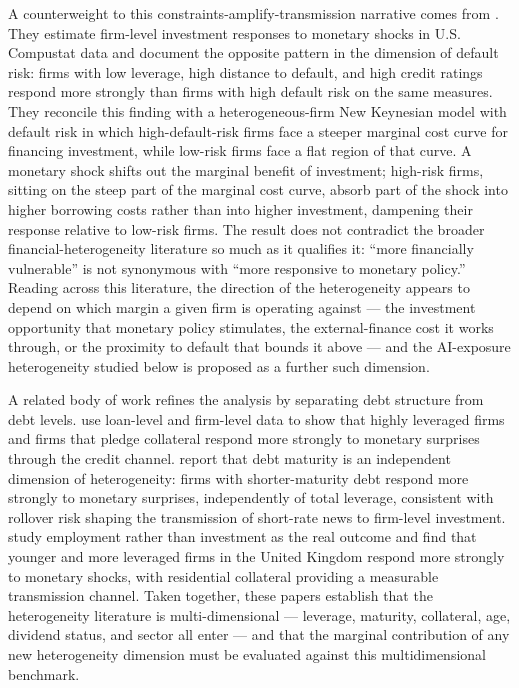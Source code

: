 A counterweight to this constraints-amplify-transmission narrative
comes from \citet{ottonelloWinberry2020}. They estimate firm-level
investment responses to monetary shocks in U.S. Compustat data and
document the opposite pattern in the dimension of default risk:
firms with low leverage, high distance to default, and high credit
ratings respond more strongly than firms with high default risk on
the same measures. They reconcile this finding with a
heterogeneous-firm New Keynesian model with default risk in which
high-default-risk firms face a steeper marginal cost curve for
financing investment, while low-risk firms face a flat region of
that curve. A monetary shock shifts out the marginal benefit of
investment; high-risk firms, sitting on the steep part of the
marginal cost curve, absorb part of the shock into higher
borrowing costs rather than into higher investment, dampening their
response relative to low-risk firms. The \citet{ottonelloWinberry2020}
result does not contradict the broader financial-heterogeneity
literature so much as it qualifies it: ``more financially
vulnerable'' is not synonymous with ``more responsive to monetary
policy.'' Reading across this literature, the direction of the
heterogeneity appears to depend on which margin a given firm is
operating against --- the investment opportunity that monetary
policy stimulates, the external-finance cost it works through, or
the proximity to default that bounds it above --- and the
AI-exposure heterogeneity studied below is proposed as a further
such dimension.

A related body of work refines the analysis by separating debt
structure from debt levels.  use loan-level and
firm-level data to show that highly leveraged firms and firms that
pledge collateral respond more strongly to monetary surprises through
the credit channel.  report that debt maturity is an
independent dimension of heterogeneity: firms with shorter-maturity
debt respond more strongly to monetary surprises, independently of
total leverage, consistent with rollover risk shaping the transmission
of short-rate news to firm-level investment. 
study employment rather than investment as the real outcome and find
that younger and more leveraged firms in the United Kingdom respond
more strongly to monetary shocks, with residential collateral providing
a measurable transmission channel. Taken together, these papers
establish that the heterogeneity literature is multi-dimensional ---
leverage, maturity, collateral, age, dividend status, and sector all
enter --- and that the marginal contribution of any new heterogeneity
dimension must be evaluated against this multidimensional benchmark.

